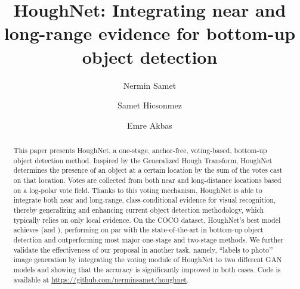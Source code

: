 \documentclass[runningheads]{llncs}
\begin{document}
\pagestyle{headings}
\mainmatter
\def\ECCVSubNumber{5063}  





\title{HoughNet: Integrating near and long-range evidence for bottom-up object detection} 


\begin{comment}
\titlerunning{ECCV-20 submission ID \ECCVSubNumber}
\authorrunning{ECCV-20 submission ID \ECCVSubNumber}
\author{Anonymous ECCV submission}
\institute{Paper ID \ECCVSubNumber}
\end{comment}



\author{Nermin Samet \and
Samet Hicsonmez \and
Emre Akbas}


\maketitle

\begin{abstract}


This paper presents HoughNet, a one-stage, anchor-free, voting-based, bottom-up object detection method. Inspired by the Generalized Hough Transform, HoughNet determines the presence of an object at a certain location by the sum of the votes cast on that location. Votes are collected from both near and long-distance locations based on a log-polar vote field. Thanks to this voting mechanism, HoughNet is able to integrate both near and long-range, class-conditional evidence for visual recognition, thereby generalizing and enhancing current object detection methodology, which typically relies on only local evidence.  On the COCO dataset, HoughNet’s best model achieves   (and  ), performing on par with the state-of-the-art in bottom-up object detection and outperforming most  major one-stage and two-stage methods. We further validate the effectiveness of our proposal in another task, namely, ``labels to photo’’ image generation by integrating the voting module of HoughNet to two different GAN models and showing that the accuracy is significantly improved in both cases. Code is available at \url{https://github.com/nerminsamet/houghnet}. 
\end{abstract}
\end{document}
